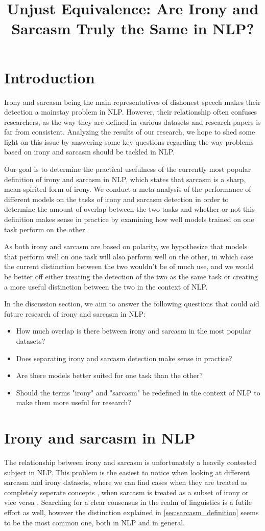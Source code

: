 \documentclass[10pt, a4paper]{article}
\title{Unjust Equivalence: Are Irony and Sarcasm Truly the Same in NLP?}
\begin{document}
\maketitleabstract

\section{Introduction}

Irony and sarcasm being the main representatives of dishonest speech makes their detection a mainstay problem in NLP. However,
their relationship often confuses researchers, as the way they are defined in various datasets and research papers is far from
consistent. Analyzing the results of our research, we hope to shed some light on this issue by answering some key questions regarding
the way problems based on irony and sarcasm should be tackled in NLP.

Our goal is to determine the practical usefulness of the currently most popular definition of irony and sarcasm in NLP, which
states that sarcasm is a sharp, mean-spirited form of irony. We conduct a meta-analysis of the performance of different
models on the tasks of irony and sarcasm detection in order to determine the amount of overlap between the two tasks and
whether or not this definition makes sense in practice by examining how well models trained on one task perform on the other.

As both irony and sarcasm are based on polarity, we hypothesize that models that perform well on one task will also perform
well on the other, in which case the current distinction between the two wouldn't be of much use, and we would be better off
either treating the detection of the two as the same task or creating a more useful distinction between the two in the context
of NLP.

In the discussion section, we aim to answer the following questions that could aid future research of irony
and sarcasm in NLP:

\begin{itemize}
   \item How much overlap is there between irony and sarcasm in the most popular datasets?
   \item Does separating irony and sarcasm detection make sense in practice?
   \item Are there models better suited for one task than the other?
   \item Should the terms "irony" and "sarcasm" be redefined in the context of NLP to make them more useful for research?
\end{itemize}

\section{Irony and sarcasm in NLP}
The relationship between irony and sarcasm is unfortunately a heavily contested subject in NLP. This problem is the easiest
to notice when looking at different sarcasm and irony datasets, where we can find cases when they are treated as completely
seperate concepts \citep{kaggle-tweets}, when sarcasm is treated as a subset of irony \citep{semeval-2018} or vice
versa \citep{iSarcasm}. Searching for a clear consensus in the realm of linguistics is a futile effort as well, however the
distinction explained in \ref{sec:sarcasm_definition} seems to be the most common one, both in NLP and in general.
\end{document}

